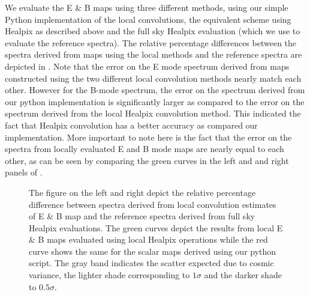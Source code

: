 We evaluate the E \& B maps using three different methods,  using our simple Python implementation of the local convolutions, the equivalent scheme using Healpix as described above and the full sky Healpix evaluation (which we use to evaluate the reference spectra). The relative percentage differences between the spectra derived from maps using the local methods and the reference spectra are depicted in . Note that the error on the E mode spectrum derived from maps constructed using the two different local convolution methods nearly match each other. However for the B-mode spectrum, the error on the spectrum derived from our python implementation is significantly larger as compared to the error on the spectrum derived from the local Healpix convolution method. This indicated the fact that Healpix convolution has a better accuracy as compared our implementation. More important to note here is the fact that the error on the spectra from locally evaluated E and B mode maps are nearly equal to each other, as can be seen by comparing the green curves in the left and and right panels of .
%
\begin{figure}[!h] 
\centering
{}
\caption{The figure on the left and right depict the relative percentage difference between spectra derived from local convolution estimates of E \& B map and the reference spectra derived from full sky Healpix evaluations. The green curves depict the results from local E \& B maps evaluated using local Healpix operations while the red curve shows the same for the scalar maps derived using our python script. The gray band indicates the scatter expected due to cosmic variance, the lighter shade corresponding to $1\sigma$ and the darker shade to $0.5 \sigma$. }
\label{fig:convolution-err}
\end{figure}
%